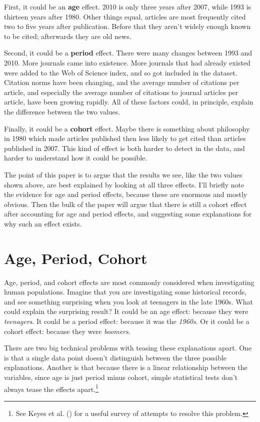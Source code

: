 \documentclass[
  11pt,
  letterpaper,
  DIV=11,
  numbers=noendperiod,
  twoside]{scrartcl}
\begin{document}
First, it could be an \textbf{age} effect. 2010 is only three years
after 2007, while 1993 is thirteen years after 1980. Other things equal,
articles are most frequently cited two to five years after publication.
Before that they aren't widely enough known to be cited; afterwards they
are old news.

Second, it could be a \textbf{period} effect. There were many changes
between 1993 and 2010. More journals came into existence. More journals
that had already existed were added to the Web of Science index, and so
got included in the dataset. Citation norms have been changing, and the
average number of citations per article, and especially the average
number of citations to journal articles per article, have been growing
rapidly. All of these factors could, in principle, explain the
difference between the two values.

Finally, it could be a \textbf{cohort} effect. Maybe there is something
about philosophy in 1980 which made articles published then less likely
to get cited than articles published in 2007. This kind of effect is
both harder to detect in the data, and harder to understand how it could
be possible.

The point of this paper is to argue that the results we see, like the
two values shown above, are best explained by looking at all three
effects. I'll briefly note the evidence for age and period effects,
because these are enormous and mostly obvious. Then the bulk of the
paper will argue that there is still a cohort effect after accounting
for age and period effects, and suggesting some explanations for why
such an effect exists.

\section{Age, Period, Cohort}\label{sec-apc}

Age, period, and cohort effects are most commonly considered when
investigating human populations. Imagine that you are investigating some
historical records, and see something surprising when you look at
teenagers in the late 1960s. What could explain the surprising result?
It could be an age effect: because they were \emph{teenagers}. It could
be a period effect: because it was the \emph{1960s}. Or it could be a
cohort effect: because they were \emph{boomers}.

There are two big technical problems with teasing these explanations
apart. One is that a single data point doesn't distinguish between the
three possible explanations. Another is that because there is a linear
relationship between the variables, since age is just period minus
cohort, simple statistical tests don't always tease the effects
apart.\footnote{See Keyes et al. ()
  for a useful survey of attempts to resolve this problem.}
\end{document}
